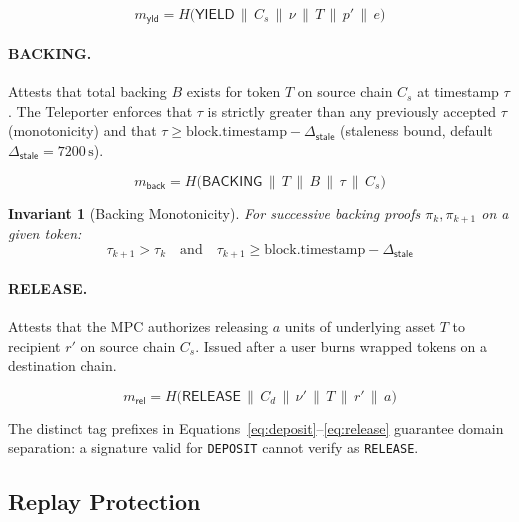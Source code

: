 \documentclass[11pt]{article}
\newtheorem{invariant}{Invariant}
\begin{document}
\begin{equation}
  m_{\mathsf{yld}} = H\bigl(\mathsf{YIELD} \,\|\, C_s \,\|\, \nu \,\|\, T \,\|\, p' \,\|\, e\bigr)
  \label{eq:yield}
\end{equation}

\paragraph{BACKING.} Attests that total backing $B$ exists for token $T$ on source chain $C_s$ at timestamp $\tau$. The Teleporter enforces that $\tau$ is strictly greater than any previously accepted $\tau$ (monotonicity) and that $\tau \geq \mathrm{block.timestamp} - \Delta_{\mathsf{stale}}$ (staleness bound, default $\Delta_{\mathsf{stale}} = 7200\,\text{s}$).

\begin{equation}
  m_{\mathsf{back}} = H\bigl(\mathsf{BACKING} \,\|\, T \,\|\, B \,\|\, \tau \,\|\, C_s\bigr)
  \label{eq:backing}
\end{equation}

\begin{invariant}[Backing Monotonicity]
For successive backing proofs $\pi_k, \pi_{k+1}$ on a given token:
\begin{equation}
  \tau_{k+1} > \tau_k \quad \text{and} \quad \tau_{k+1} \geq \mathrm{block.timestamp} - \Delta_{\mathsf{stale}}
\end{equation}
\end{invariant}

\paragraph{RELEASE.} Attests that the MPC authorizes releasing $a$ units of underlying asset $T$ to recipient $r'$ on source chain $C_s$. Issued after a user burns wrapped tokens on a destination chain.

\begin{equation}
  m_{\mathsf{rel}} = H\bigl(\mathsf{RELEASE} \,\|\, C_d \,\|\, \nu' \,\|\, T \,\|\, r' \,\|\, a\bigr)
  \label{eq:release}
\end{equation}

The distinct tag prefixes in Equations~\eqref{eq:deposit}--\eqref{eq:release} guarantee domain separation: a signature valid for \texttt{DEPOSIT} cannot verify as \texttt{RELEASE}.

\subsection{Replay Protection}
\label{sec:replay}
\end{document}
